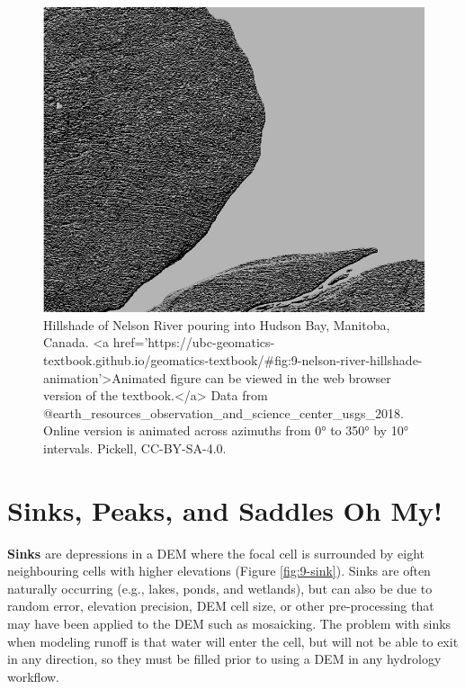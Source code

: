 \documentclass[
]{book}
\begin{document}
\begin{figure}
\includegraphics[width=0.75\linewidth]{images/09-nelson-river-hillshade-animation} \caption{Hillshade of Nelson River pouring into Hudson Bay, Manitoba, Canada. <a href='https://ubc-geomatics-textbook.github.io/geomatics-textbook/#fig:9-nelson-river-hillshade-animation'>Animated figure can be viewed in the web browser version of the textbook.</a> Data from @earth_resources_observation_and_science_center_usgs_2018. Online version is animated across azimuths from 0° to 350° by 10° intervals. Pickell, CC-BY-SA-4.0.}\label{fig:9-nelson-river-hillshade-animation}
\end{figure}

\hypertarget{sinks-peaks-and-saddles-oh-my}{%
\section{Sinks, Peaks, and Saddles Oh My!}\label{sinks-peaks-and-saddles-oh-my}}

\textbf{Sinks} are depressions in a DEM where the focal cell is surrounded by eight neighbouring cells with higher elevations (Figure \ref{fig:9-sink}). Sinks are often naturally occurring (e.g., lakes, ponds, and wetlands), but can also be due to random error, elevation precision, DEM cell size, or other pre-processing that may have been applied to the DEM such as mosaicking. The problem with sinks when modeling runoff is that water will enter the cell, but will not be able to exit in any direction, so they must be filled prior to using a DEM in any hydrology workflow.
\end{document}
